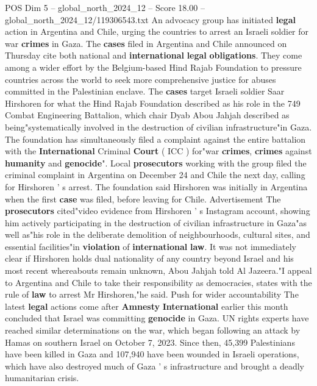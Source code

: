 \begin{textsample}{POS Dim 5 – global\_north\_2024\_12 – Score 18.00 – global\_north\_2024\_12/119306543.txt}  \label{ex:f5_pos_125}
An advocacy group has initiated \textbf{legal} action in Argentina and Chile, urging the countries to arrest an Israeli soldier for war \textbf{crimes} in Gaza.
The \textbf{cases} filed in Argentina and Chile announced on Thursday cite both national and \textbf{international} \textbf{legal} \textbf{obligations}.
They come among a wider effort by the Belgium-based Hind Rajab Foundation to pressure countries across the world to seek more comprehensive justice for abuses committed in the Palestinian enclave.
The \textbf{cases} target Israeli soldier Saar Hirshoren for what the Hind Rajab Foundation described as his role in the 749 Combat Engineering Battalion, which chair Dyab Abou Jahjah described as being"systematically involved in the destruction of civilian infrastructure"in Gaza.
The foundation has simultaneously filed a complaint against the entire battalion with the \textbf{International} Criminal \textbf{Court} ( ICC ) for"war \textbf{crimes}, \textbf{crimes} against \textbf{humanity} and \textbf{genocide}".
Local \textbf{prosecutors} working with the group filed the criminal complaint in Argentina on December 24 and Chile the next day, calling for Hirshoren ' s arrest.
The foundation said Hirshoren was initially in Argentina when the first \textbf{case} was filed, before leaving for Chile.
Advertisement The \textbf{prosecutors} cited"video evidence from Hirshoren ' s Instagram account, showing him actively participating in the destruction of civilian infrastructure in Gaza"as well as"his role in the deliberate demolition of neighbourhoods, cultural sites, and essential facilities"in \textbf{violation} of \textbf{international} \textbf{law}.
It was not immediately clear if Hirshoren holds dual nationality of any country beyond Israel and his most recent whereabouts remain unknown, Abou Jahjah told Al Jazeera."I appeal to Argentina and Chile to take their responsibility as democracies, states with the rule of \textbf{law} to arrest Mr Hirshoren,"he said.
Push for wider accountability The latest \textbf{legal} actions come after \textbf{Amnesty} \textbf{International} earlier this month concluded that Israel was committing \textbf{genocide} in Gaza.
UN rights experts have reached similar determinations on the war, which began following an attack by Hamas on southern Israel on October 7, 2023.
Since then, 45,399 Palestinians have been killed in Gaza and 107,940 have been wounded in Israeli operations, which have also destroyed much of Gaza ' s infrastructure and brought a deadly humanitarian crisis.

\end{textsample}
